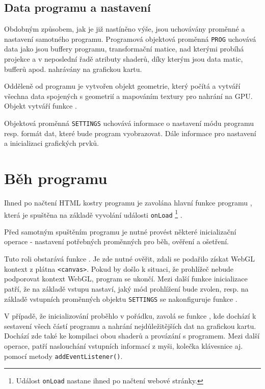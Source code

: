 \newpage

\subsection{Data programu a nastavení}
Obdobným způsobem, jak je již nastíněno výše, jsou uchovávány proměnné a nastavení samotného programu. Programová objektová proměnná \texttt{PROG} uchovává data jako jsou buffery programu, transformační matice, nad kterými probíhá projekce a v neposlední řadě atributy shaderů, díky kterým jsou data matic, bufferů apod. nahrávány na grafickou kartu. 

Odděleně od programu je vytvořen objekt geometrie, který počítá a vytváří všechna data spojených s geometrií a mapováním textury pro nahrání na GPU. Objekt vytváří funkce \texttt{\createSphereGeometry}.

Objektová proměnná \texttt{SETTINGS} uchovává informace o nastavení módu programu resp. formát dat, které bude program vyobrazovat. Dále informace pro nastavení a inicializaci grafických prvků.


\section{Běh programu}
Ihned po načtení HTML kostry programu je zavolána hlavní funkce programu \texttt{\main}, která je spuštěna  na základě vyvolání události \texttt{onLoad} \footnote{ Událost \texttt{onLoad} nastane ihned po načtení webové stránky.} .

Před samotným spuštěním programu je nutné provést některé inicializační operace - nastavení potřebných proměnných pro běh, ověření a ošetření. 

Tuto roli obstarává funkce \texttt{\initProgram}. Je zde nutné ověřit, zdali se podařilo získat WebGL kontext z plátna \texttt{<canvas>}. Pokud by došlo k situaci, že prohlížeč nebude podporovat kontext WebGL, program se ukončí. Mezi další funkce inicializace patří, že na základě vstupu nastaví, jaký mód prohlížení bude zvolen, resp. na základě vstupních proměnných objektu \texttt{SETTINGS}  se nakonfiguruje funkce \texttt{\createSphereGeometry}. 

V případě, že inicializování proběhlo v pořádku, zavolá se funkce \texttt{\setupProgram}, kde dochází k sestavení všech částí programu a nahrání nejdůležitějších dat na grafickou kartu. Dochází zde také ke kompilaci obou shaderů a provázání s programem. Mezi další operace, patří naslouchání vstupních informací z myši, kolečka klávesnice aj.  pomocí metody \texttt{addEventListener()}.

